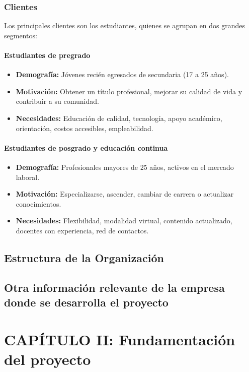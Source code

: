 \documentclass[stu, 12pt,letterpaper,donotrepeattitle,floatsintext,natbib]{apa7}
\begin{document}
	\subsubsection{Clientes}
	Los principales clientes son los estudiantes, quienes se agrupan en dos grandes segmentos:
	
	\paragraph{Estudiantes de pregrado}
	\begin{itemize}
		\item \textbf{Demografía:} Jóvenes recién egresados de secundaria (17 a 25 años).
		\item \textbf{Motivación:} Obtener un título profesional, mejorar su calidad de vida y contribuir a su comunidad.
		\item \textbf{Necesidades:} Educación de calidad, tecnología, apoyo académico, orientación, costos accesibles, empleabilidad.
	\end{itemize}
	
	\paragraph{Estudiantes de posgrado y educación continua}
	\begin{itemize}
		\item \textbf{Demografía:} Profesionales mayores de 25 años, activos en el mercado laboral.
		\item \textbf{Motivación:} Especializarse, ascender, cambiar de carrera o actualizar conocimientos.
		\item \textbf{Necesidades:} Flexibilidad, modalidad virtual, contenido actualizado, docentes con experiencia, red de contactos.
	\end{itemize}
	
	\subsection{Estructura de la Organización}
	\subsection{Otra información relevante de la empresa donde se desarrolla el proyecto}
	
	\section{CAPÍTULO II: Fundamentación del proyecto}
\end{document}
